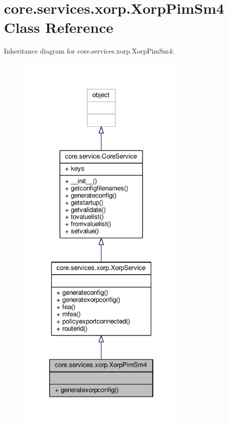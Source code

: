 \hypertarget{classcore_1_1services_1_1xorp_1_1_xorp_pim_sm4}{\section{core.\+services.\+xorp.\+Xorp\+Pim\+Sm4 Class Reference}
\label{classcore_1_1services_1_1xorp_1_1_xorp_pim_sm4}
}


Inheritance diagram for core.\+services.\+xorp.\+Xorp\+Pim\+Sm4\+:
\nopagebreak
\begin{figure}[H]
\begin{center}
\leavevmode
\includegraphics[height=550pt]{classcore_1_1services_1_1xorp_1_1_xorp_pim_sm4__inherit__graph}
\end{center}
\end{figure}


